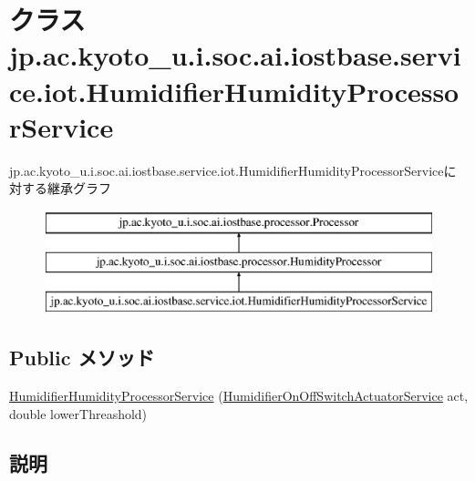 \hypertarget{classjp_1_1ac_1_1kyoto__u_1_1i_1_1soc_1_1ai_1_1iostbase_1_1service_1_1iot_1_1_humidifier_humidity_processor_service}{\section{クラス jp.\-ac.\-kyoto\-\_\-u.\-i.\-soc.\-ai.\-iostbase.\-service.\-iot.\-Humidifier\-Humidity\-Processor\-Service}
\label{classjp_1_1ac_1_1kyoto__u_1_1i_1_1soc_1_1ai_1_1iostbase_1_1service_1_1iot_1_1_humidifier_humidity_processor_service}
}
jp.\-ac.\-kyoto\-\_\-u.\-i.\-soc.\-ai.\-iostbase.\-service.\-iot.\-Humidifier\-Humidity\-Processor\-Serviceに対する継承グラフ\begin{figure}[H]
\begin{center}
\leavevmode
\includegraphics[height=3.000000cm]{classjp_1_1ac_1_1kyoto__u_1_1i_1_1soc_1_1ai_1_1iostbase_1_1service_1_1iot_1_1_humidifier_humidity_processor_service}
\end{center}
\end{figure}
\subsection*{Public メソッド}
\begin{DoxyCompactItemize}
\item 
\hyperlink{classjp_1_1ac_1_1kyoto__u_1_1i_1_1soc_1_1ai_1_1iostbase_1_1service_1_1iot_1_1_humidifier_humidity_processor_service_ab06d3fb8e86a9a1cd332c948138d8aa8}{Humidifier\-Humidity\-Processor\-Service} (\hyperlink{classjp_1_1ac_1_1kyoto__u_1_1i_1_1soc_1_1ai_1_1iostbase_1_1service_1_1iot_1_1_humidifier_on_off_switch_actuator_service}{Humidifier\-On\-Off\-Switch\-Actuator\-Service} act, double lower\-Threashold)
\end{DoxyCompactItemize}


\subsection{説明}



